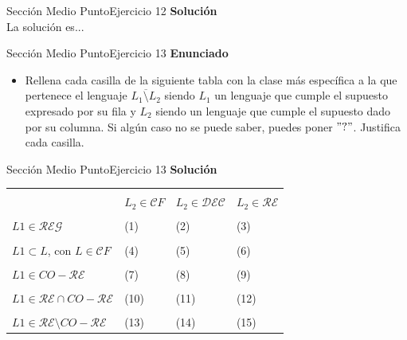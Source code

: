 \documentclass[10pt, envcountsect, presentation, aspectratio=169]{beamer}
\newcommand{\lreg}{\ensuremath{\mathcal {REG}}}
\newcommand{\lcf}{\ensuremath{\mathcal CF}}
\newcommand{\ld}{\ensuremath{\mathcal {DEC}}}
\newcommand{\lr}{\ensuremath{\mathcal {RE}}}
\begin{document}

\begin{frame}{Sección Medio Punto}{Ejercicio 12}
    \textbf{Solución}\\
    La solución es...
\end{frame}


\begin{frame}{Sección Medio Punto}{Ejercicio 13}
    \textbf{Enunciado}
    \begin{itemize}
        \item Rellena cada casilla de la siguiente tabla con la clase más específica a la que pertenece el lenguaje  $\overline{L_1 \setminus L_2}$ siendo $L_1$ un lenguaje que cumple el supuesto expresado por su fila y $L_2$ siendo un lenguaje que cumple el supuesto dado por su columna. Si algún caso no se puede saber, puedes poner   $"?"$. Justifica cada casilla.\\
    \end{itemize}
\end{frame}


\begin{frame}{Sección Medio Punto}{Ejercicio 13}
    \textbf{Solución}\\
    \begin{table}[h]
             \begin{tabular}{|l|l|l|l|}
             \hline
             &&&\\
             &$L_2 \in \lcf$ &$ L_2 \in \ld$ & $ L_2 \in \lr$\\
             \hline
             &&&\\
              $ L1 \in \lreg$&(1)&(2)&(3)\\
              \hline
             &&&\\
             $ L1 \subset L$, con $L \in \lcf$&(4)&(5)&(6)\\
              \hline
             &&&\\
             $L1 \in CO-\lr $&(7)&(8)&(9)\\
              \hline
             &&&\\
             $L1 \in \lr \cap CO-\lr$&(10)&(11)&(12)\\
              \hline
             &&&\\
             $ L1 \in \lr \setminus CO-\lr$&(13)&(14)&(15)\\
              \hline
             \end{tabular}
        \end{table}
\end{frame}
\end{document}

